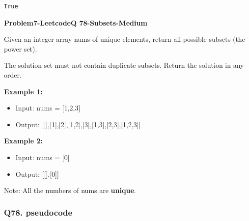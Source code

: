 \documentclass[11pt]{article}
\providecommand{\tightlist}{%
      \setlength{\itemsep}{0pt}\setlength{\parskip}{0pt}}
\begin{document}
    \begin{Verbatim}[commandchars=\\\{\}]
True
    \end{Verbatim}

    \textbf{Problem7-LeetcodeQ 78-Subsets-Medium}

Given an integer array nums of unique elements, return all possible
subsets (the power set).

The solution set must not contain duplicate subsets. Return the solution
in any order.

\textbf{Example 1:}

\begin{itemize}
\tightlist
\item
  Input: nums = {[}1,2,3{]}
\item
  Output:
  {[}{[}{]},{[}1{]},{[}2{]},{[}1,2{]},{[}3{]},{[}1,3{]},{[}2,3{]},{[}1,2,3{]}{]}
\end{itemize}

\textbf{Example 2:}

\begin{itemize}
\tightlist
\item
  Input: nums = {[}0{]}
\item
  Output: {[}{[}{]},{[}0{]}{]}
\end{itemize}

Note: All the numbers of nums are \textbf{unique}.

    \subsubsection{Q78. pseudocode}\label{q78.-pseudocode}
\end{document}
